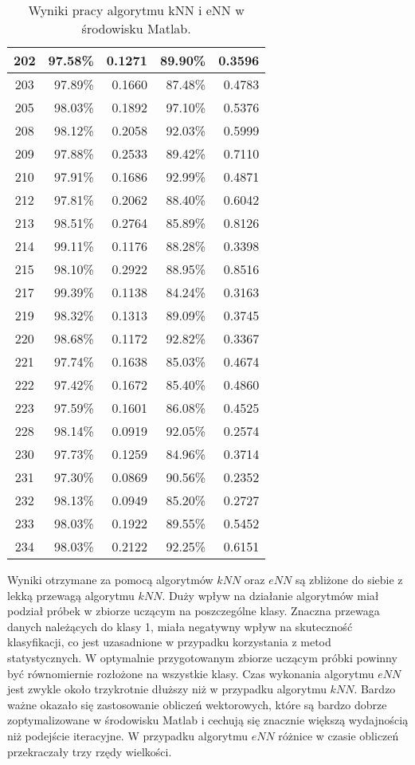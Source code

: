 \begin{table}[H]
\begin{tabular}{|c|r|r|r|r|}
\hline
202 &  97.58\% & 0.1271 &  89.90\% & 0.3596 \\ 
\hline
203 &  97.89\% & 0.1660 &  87.48\% & 0.4783 \\ 
\hline
205 &  98.03\% & 0.1892 &  97.10\% & 0.5376 \\ 
\hline
208 &  98.12\% & 0.2058 &  92.03\% & 0.5999 \\ 
\hline
209 &  97.88\% & 0.2533 &  89.42\% & 0.7110 \\ 
\hline
210 &  97.91\% & 0.1686 &  92.99\% & 0.4871 \\ 
\hline
212 &  97.81\% & 0.2062 &  88.40\% & 0.6042 \\ 
\hline
213 &  98.51\% & 0.2764 &  85.89\% & 0.8126 \\ 
\hline
214 &  99.11\% & 0.1176 &  88.28\% & 0.3398 \\ 
\hline
215 &  98.10\% & 0.2922 &  88.95\% & 0.8516 \\ 
\hline
217 &  99.39\% & 0.1138 &  84.24\% & 0.3163 \\ 
\hline
219 &  98.32\% & 0.1313 &  89.09\% & 0.3745 \\ 
\hline
220 &  98.68\% & 0.1172 &  92.82\% & 0.3367 \\ 
\hline
221 &  97.74\% & 0.1638 &  85.03\% & 0.4674 \\ 
\hline
222 &  97.42\% & 0.1672 &  85.40\% & 0.4860 \\ 
\hline
223 &  97.59\% & 0.1601 &  86.08\% & 0.4525 \\ 
\hline
228 &  98.14\% & 0.0919 &  92.05\% & 0.2574 \\ 
\hline
230 &  97.73\% & 0.1259 &  84.96\% & 0.3714 \\ 
\hline
231 &  97.30\% & 0.0869 &  90.56\% & 0.2352 \\ 
\hline
232 &  98.13\% & 0.0949 &  85.20\% & 0.2727 \\ 
\hline
233 &  98.03\% & 0.1922 &  89.55\% & 0.5452 \\ 
\hline
234 &  98.03\% & 0.2122 &  92.25\% & 0.6151 \\ 
\hline
		
	\end{tabular}
	\caption{Wyniki pracy algorytmu kNN i eNN w środowisku Matlab.}
	\label{tab:matlab-skutecznosc}
	
\end{table}

Wyniki otrzymane za pomocą algorytmów $kNN$ oraz $eNN$ są zbliżone do siebie z lekką przewagą algorytmu $kNN$. Duży wpływ na działanie algorytmów miał podział próbek w zbiorze uczącym na poszczególne klasy. Znaczna przewaga danych należących do klasy 1, miała negatywny wpływ na skuteczność klasyfikacji, co jest uzasadnione w przypadku korzystania z metod statystycznych. W optymalnie przygotowanym zbiorze uczącym próbki powinny być równomiernie rozłożone na wszystkie klasy. Czas wykonania algorytmu $eNN$ jest zwykle około trzykrotnie dłuższy niż w przypadku algorytmu $kNN$. Bardzo ważne okazało się zastosowanie obliczeń wektorowych, które są bardzo dobrze zoptymalizowane w środowisku Matlab i cechują się znacznie większą wydajnością niż podejście iteracyjne. W przypadku algorytmu $eNN$ różnice w czasie obliczeń przekraczały trzy rzędy wielkości.